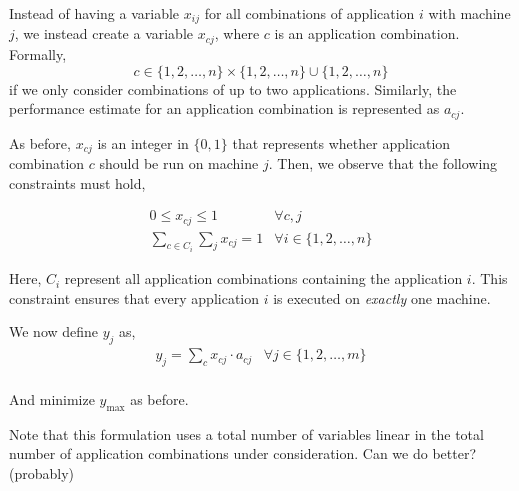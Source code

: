 \documentclass{article}
\begin{document}
Instead of having a variable $x_{ij}$ for all combinations of application $i$
with machine $j$, we instead create a variable $x_{cj}$,
where $c$ is an application combination. Formally,
$$c \in \{1, 2, \ldots, n\} \times \{1, 2, \ldots, n\} \cup \{1, 2, \ldots, n\}$$
if we only consider combinations of up to two applications.
Similarly, the performance estimate for an application combination is represented
as $a_{cj}$.

As before, $x_{cj}$ is an integer in $\{0, 1\}$ that represents whether
application combination $c$ should be run on machine $j$. Then, we observe that
the following constraints must hold,

\begin{eqnarray}
0 \leq x_{cj} \leq 1 & \forall c,j \nonumber \\
\sum_{c \in C_i} \sum_j x_{cj} = 1 & \forall i \in \{1, 2, \ldots, n\} \nonumber
\end{eqnarray}

Here, $C_i$ represent all application combinations containing the application $i$.
This constraint ensures that every application $i$ is executed on \emph{exactly}
one machine.

We now define $y_j$ as,
\begin{eqnarray}
y_j = \sum_c x_{cj} \cdot a_{cj} & \forall j \in \{1, 2, \ldots, m\} \nonumber \\
\end{eqnarray}

And minimize $y_{\text{max}}$ as before.

Note that this formulation uses a total number of variables
linear in the total number of application combinations
under consideration. Can we do better? (probably)
\end{document}
